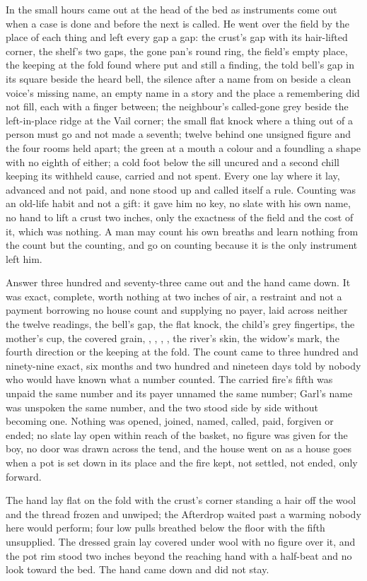 In the small hours  came out at the head of the bed as instruments come out when a case is done and before the next is called. He went over the field by the place of each thing and left every gap a gap: the crust's gap with its hair-lifted corner, the shelf's two gaps, the gone pan's round ring, the field's empty place, the keeping at the fold found where put and still a finding, the told bell's gap in its square beside the heard bell, the silence after a name from  on  beside a clean voice's missing name, an empty name in a story and the place a remembering did not fill, each with a finger between; the neighbour's called-gone grey beside the left-in-place ridge at the Vail corner; the small flat knock where a thing out of a person must go and not made a seventh; twelve behind one unsigned figure and the four rooms held apart; the green at a mouth a colour and a foundling a shape with no eighth of either; a cold foot below the sill uncured and a second chill keeping its withheld cause, carried and not spent. Every one lay where it lay, advanced and not paid, and none stood up and called itself a rule. Counting was an old-life habit and not a gift: it gave him no key, no slate with his own name, no hand to lift a crust two inches, only the exactness of the field and the cost of it, which was nothing. A man may count his own breaths and learn nothing from the count but the counting, and go on counting because it is the only instrument left him.

Answer three hundred and seventy-three came out and the hand came down. It was exact, complete, worth nothing at two inches of air, a restraint and not a payment borrowing no house count and supplying no payer, laid across neither the twelve readings, the bell's gap, the flat knock, the child's grey fingertips, the mother's cup, the covered grain, , , , , the river's skin, the widow's mark, the fourth direction or the keeping at the fold. The count came to three hundred and ninety-nine exact, six months and two hundred and nineteen days told by nobody who would have known what a number counted. The carried fire's fifth was unpaid the same number and its payer unnamed the same number; Garl's name was unspoken the same number, and the two stood side by side without becoming one. Nothing was opened, joined, named, called, paid, forgiven or ended; no slate lay open within reach of the basket, no figure was given for the boy, no door was drawn across the tend, and the house went on as a house goes when a pot is set down in its place and the fire kept, not settled, not ended, only forward.

The hand lay flat on the fold with the crust's corner standing a hair off the wool and the thread frozen and unwiped; the Afterdrop waited past a warming nobody here would perform; four low pulls breathed below the floor with the fifth unsupplied. The dressed grain lay covered under wool with no figure over it, and the pot rim stood two inches beyond the reaching hand with a half-beat and no look toward the bed. The hand came down and did not stay.
